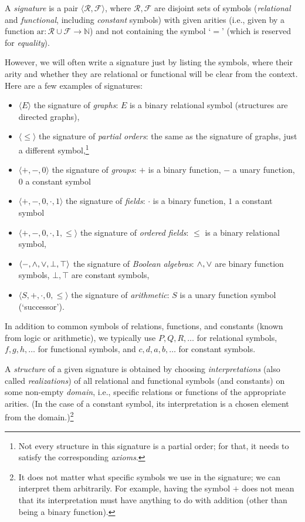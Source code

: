 \begin{definition}
    A \emph{signature} is a pair $\langle\mathcal R,\mathcal F\rangle$, where $\mathcal R,\mathcal F$ are disjoint sets of symbols (\emph{relational} and \emph{functional}, including \emph{constant} symbols) with given arities (i.e., given by a function $\mathrm{ar}\colon \mathcal R\cup\mathcal F\to\mathbb N$) and not containing the symbol `$=$' (which is reserved for \emph{equality}).
\end{definition}

However, we will often write a signature just by listing the symbols, where their arity and whether they are relational or functional will be clear from the context. Here are a few examples of signatures:
\begin{itemize}
    \item $\langle E \rangle$ the signature of \emph{graphs}: $E$ is a binary relational symbol (structures are directed graphs),
    \item $\langle \leq \rangle$ the signature of \emph{partial orders}: the same as the signature of graphs, just a different symbol,\footnote{Not every structure in this signature is a partial order; for that, it needs to satisfy the corresponding \emph{axioms}.}
    \item $\langle +, -, 0\rangle$ the signature of \emph{groups}: $+$ is a binary function, $-$ a unary function, $0$ a constant symbol
    \item $\langle +, -, 0,\cdot,1\rangle$ the signature of \emph{fields}: $\cdot$ is a binary function, $1$ a constant symbol
    \item $\langle +, -, 0,\cdot,1,\leq\rangle$ the signature of \emph{ordered fields}: $\leq$ is a binary relational symbol,
    \item $\langle -,{\land},{\lor},\bot,\top\rangle$ the signature of \emph{Boolean algebras}: ${\land},{\lor}$ are binary function symbols, $\bot,\top$ are constant symbols,
    \item $\langle S,+,\cdot,0,\leq\rangle$ the signature of \emph{arithmetic}: $S$ is a unary function symbol (`successor').
\end{itemize}
In addition to common symbols of relations, functions, and constants (known from logic or arithmetic), we typically use $P,Q,R,\dots$ for relational symbols, $f,g,h,\dots$ for functional symbols, and $c,d,a,b,\dots$ for constant symbols.

A \emph{structure} of a given signature is obtained by choosing \emph{interpretations} (also called \emph{realizations}) of all relational and functional symbols (and constants) on some non-empty \emph{domain}, i.e., specific relations or functions of the appropriate arities. (In the case of a constant symbol, its interpretation is a chosen element from the domain.)\footnote{It does not matter what specific symbols we use in the signature; we can interpret them arbitrarily. For example, having the symbol $+$ does not mean that its interpretation must have anything to do with addition (other than being a binary function).}

